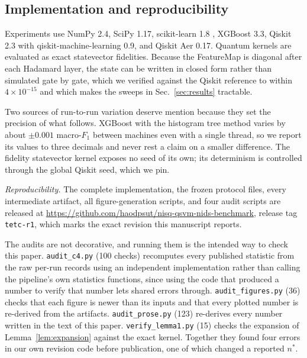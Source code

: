 \subsection{Implementation and reproducibility}
\begin{revbody}

Experiments use NumPy 2.4, SciPy 1.17, scikit-learn 1.8 \cite{ref30},
XGBoost 3.3, Qiskit 2.3 \cite{ref29} with qiskit-machine-learning 0.9, and
Qiskit Aer 0.17. Quantum
kernels are evaluated as exact statevector fidelities. Because the
\ZZ{}FeatureMap is diagonal after each Hadamard layer, the state can be written
in closed form rather than simulated gate by gate, which we verified against the
Qiskit reference to within $4\times10^{-15}$ and which makes the sweeps in
Sec.~\ref{sec:results} tractable.

Two sources of run-to-run variation deserve mention because they set the
precision of what follows. XGBoost with the histogram tree method varies by
about $\pm0.001$ macro-$F_1$ between machines even with a single thread, so we
report its values to three decimals and never rest a claim on a smaller
difference. The fidelity statevector kernel exposes no seed of its own; its
determinism is controlled through the global Qiskit seed, which we pin.

\emph{Reproducibility.} The complete implementation, the frozen protocol files,
every intermediate artifact, all figure-generation scripts, and four audit
scripts are released at
\url{https://github.com/haodpsut/nisq-qsvm-nids-benchmark}, release tag \texttt{tetc-r1}, which
marks the exact revision this manuscript reports.

The audits are not decorative, and running them is the intended way to check
this paper. \texttt{audit\_c4.py} (100 checks) recomputes every published
statistic from the raw per-run records using an independent implementation
rather than calling the pipeline's own statistics functions, since using the
code that produced a number to verify that number lets shared errors through.
\texttt{audit\_figures.py} (36) checks that each figure is newer than its inputs
and that every plotted number is re-derived from the artifacts.
\texttt{audit\_prose.py} (123) re-derives every number written in the text of
this paper. \texttt{verify\_lemma1.py} (15) checks the expansion of
Lemma~\ref{lem:expansion} against the exact kernel. Together they found four
errors in our own revision code before publication, one of which changed a
reported $n^{\ast}$.
\end{revbody}
